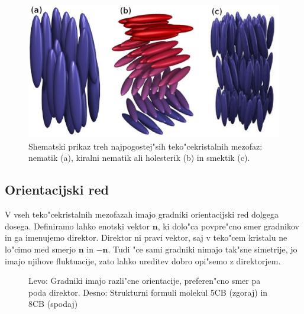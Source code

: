 \documentclass[a4paper,10pt]{article}
\begin{document}
\begin{figure}[h]
\centering
  \includegraphics[width=.8\textwidth]{./Slike/faze}
 \caption{Shematski prikaz treh najpogostej"sih teko"cekristalnih mezofaz: nematik (a), kiralni nematik ali holesterik (b) in smektik (c)\cite{wiki:lc}.}
  \label{fig:faze}
\end{figure}

\subsection{Orientacijski red}

V vseh teko"cekristalnih mezofazah imajo gradniki orientacijski red dolgega dosega. Definiramo lahko enotski vektor $\mathbf{n}$, ki dolo"ca povpre"cno smer gradnikov in ga imenujemo direktor. Direktor ni pravi vektor, saj v teko"cem kristalu ne lo"cimo med smerjo $\mathbf{n}$ in $\mathbf{-n}$. Tudi "ce sami gradniki nimajo tak"sne simetrije, jo imajo njihove fluktuacije, zato lahko ureditev dobro opi"semo z direktorjem\cite{mermin}. 

\begin{figure}[h]
\begin{center}
 \caption{Levo: Gradniki imajo razli"cne orientacije, preferen"cno smer pa poda direktor. Desno: Strukturni formuli molekul 5CB (zgoraj) in 8CB (spodaj)\cite{wiki:lc}}
 \label{fig:nematik-direktor}
 \end{center}
\end{figure}
\end{document}
